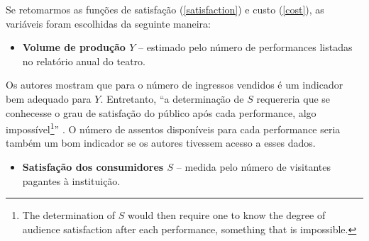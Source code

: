 \documentclass[a4paper, 12pt, openright, oneside, german, french, english, brazil]{abntex2}
\begin{document}
	
	
	Se retomarmos as funções de satisfação (\ref{satisfaction}) e custo (\ref{cost}), as variáveis foram escolhidas da seguinte maneira:
	
	\begin{itemize}
		\item \textbf{Volume de produção $Y$} -- estimado pelo número de performances listadas no relatório anual do teatro.
	\end{itemize}
	
	
	Os autores mostram que para  o número de ingressos vendidos é um indicador bem adequado para $Y$. Entretanto, ``a determinação de $S$ requereria que se conhecesse o grau de satisfação do público após cada performance, algo impossível\footnote{The determination of $S$ would then require one to know the degree of audience satisfaction after each performance, something that is impossible.}'' \cite[p. 264]{biencourt2002market}.  O número de assentos disponíveis para cada performance seria também um bom indicador se os autores tivessem acesso a esses dados.
	
	\begin{itemize}
		\item \textbf{Satisfação dos consumidores $S$} -- medida pelo número de visitantes pagantes à instituição.
	\end{itemize}
	
	
\end{document}
